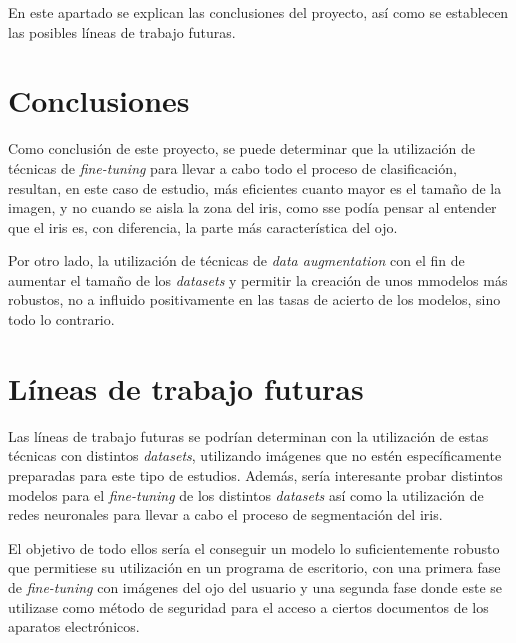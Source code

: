  \label{capitulo7}

En este apartado se explican las conclusiones del proyecto, así como se establecen las posibles líneas de trabajo futuras.

\section{Conclusiones}

Como conclusión de este proyecto, se puede determinar que la utilización de técnicas de \textit{fine-tuning} para llevar a cabo todo el proceso de clasificación,
resultan, en este caso de estudio, más eficientes cuanto mayor es el tamaño de la imagen, y no cuando se aisla la zona del iris, como sse podía pensar al entender
que el iris es, con diferencia, la parte más característica del ojo. 

Por otro lado, la utilización de técnicas de \textit{data augmentation} con el fin de aumentar el tamaño de los \textit{datasets} y permitir la creación de unos mmodelos más robustos,
no a influido positivamente en las tasas de acierto de los modelos, sino todo lo contrario.


\section{Líneas de trabajo futuras}

Las líneas de trabajo futuras se podrían determinan con la utilización de estas técnicas con distintos \textit{datasets}, utilizando imágenes que no estén específicamente preparadas
para este tipo de estudios. Además, sería interesante probar distintos modelos para el \textit{fine-tuning} de los distintos \textit{datasets} así como la utilización de redes neuronales
para llevar a cabo el proceso de segmentación del iris.

El objetivo de todo ellos sería el conseguir un modelo lo suficientemente robusto
que permitiese su utilización en un programa de escritorio, con una primera fase de \textit{fine-tuning} con imágenes del ojo del usuario y una segunda fase donde este 
se utilizase como método de seguridad para el acceso a ciertos documentos de los aparatos electrónicos.